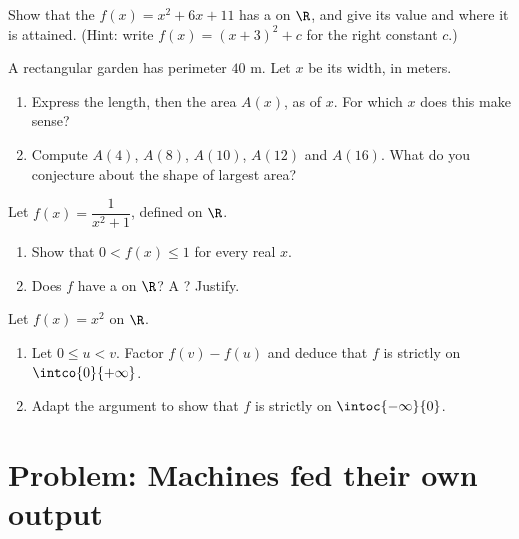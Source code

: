 \begin{exercise}[$\star\star$]\label{exo:g10:functions:7}
Show that the  $f(x) = x^2 + 6x + 11$ has a  on $\R$, and
give its value and where it is attained. (Hint: write
$f(x) = (x + 3)^2 + c$ for the right constant $c$.)
\end{exercise}

\begin{exercise}[$\star\star$]\label{exo:g10:functions:8}
A rectangular garden has perimeter $40$ m. Let $x$ be its width, in
meters.
\begin{enumerate}
  \item Express the length, then the area $A(x)$, as  of $x$.
        For which $x$ does this make sense?
  \item Compute $A(4)$, $A(8)$, $A(10)$, $A(12)$ and $A(16)$. What do you
        conjecture about the shape of largest area?
\end{enumerate}
\end{exercise}

\begin{exercise}[$\star\star$]\label{exo:g10:functions:9}
Let $f(x) = \dfrac{1}{x^2 + 1}$, defined on $\R$.
\begin{enumerate}
  \item Show that $0 < f(x) \leq 1$ for every real $x$.
  \item Does $f$ have a  on $\R$? A ? Justify.
\end{enumerate}
\end{exercise}

\begin{exercise}[$\star\star\star$]\label{exo:g10:functions:10}
Let $f(x) = x^2$ on $\R$.
\begin{enumerate}
  \item Let $0 \leq u < v$. Factor $f(v) - f(u)$ and deduce that $f$ is
        strictly  on $\intco{0}{+\infty}$.
  \item Adapt the argument to show that $f$ is strictly  on
        $\intoc{-\infty}{0}$.
\end{enumerate}
\end{exercise}

\section{Problem: Machines fed their own output}

